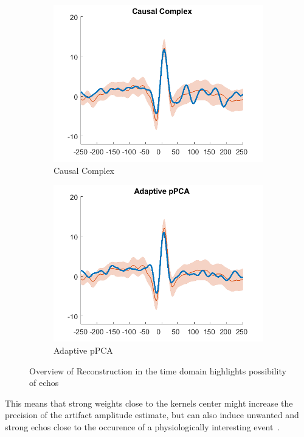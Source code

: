 \documentclass[a4paper]{article}
\begin{document}
\begin{figure}[hbtp]
\begin{subfigure}{0.245\textwidth}
        \includegraphics[width=\textwidth]{./img/eva/ecg_td_Causal_Complex.png}
        \caption{Causal Complex}\label{fig:td_causaldft}
    \end{subfigure}
    \begin{subfigure}{0.245\textwidth}
        \includegraphics[width=\textwidth]{./img/eva/ecg_td_Adaptive_pPCA.png}
        \caption{Adaptive pPCA}\label{fig:td_pPCA}
    \end{subfigure}
    \caption{Overview of Reconstruction in the time domain highlights possibility of echos}\label{fig:td_echo}
\end{figure}

This means that strong weights close to the kernels center might increase the precision of the artifact amplitude estimate, but can also induce unwanted and strong echos  close to the occurence of a physiologically interesting event~\label{fig:td_echo}.
\end{document}
